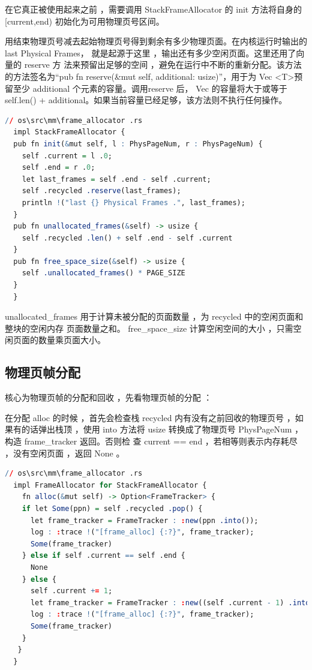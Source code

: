 \documentclass[12pt, a4paper]{ctexart}
\begin{document}
	在它真正被使用起来之前 ，需要调用 StackFrameAllocator 的  init 方法将自身的  [current,end) 初始化为可用物理页号区间。
	
	用结束物理页号减去起始物理页号得到剩余有多少物理页面。在内核运行时输出的 last {} Physical Frames， 就是起源于这里 ，输出还有多少空闲页面。这里还用了向量的 reserve 方 法来预留出足够的空间 ，避免在运行中不断的重新分配。该方法的方法签名为“pub fn reserve(\&mut self, additional: usize)”，用于为 Vec \textless T\textgreater 预留至少 additional 个元素的容量。调用reserve 后， Vec 的容量将大于或等于 self.len() + additional。如果当前容量已经足够，该方法则不执行任何操作。
	
\begin{lstlisting}[language=R]
  // os\src\mm\frame_allocator .rs
  impl StackFrameAllocator {
  pub fn init(&mut self, l : PhysPageNum, r : PhysPageNum) {
    self .current = l .0;
    self .end = r .0;
    let last_frames = self .end - self .current;
    self .recycled .reserve(last_frames);
    println !("last {} Physical Frames .", last_frames);
  }
  pub fn unallocated_frames(&self) -> usize {
    self .recycled .len() + self .end - self .current
  }
  pub fn free_space_size(&self) -> usize {
    self .unallocated_frames() * PAGE_SIZE
  }
  }
\end{lstlisting}
	
	unallocated\_frames 用于计算未被分配的页面数量 ，为 recycled 中的空闲页面和整块的空闲内存 页面数量之和。   free\_space\_size 计算空闲空间的大小 ，只需空闲页面的数量乘页面大小。
	\subsection{物理页帧分配}
	核心为物理页帧的分配和回收 ，先看物理页帧的分配 ：
	
	在分配  alloc 的时候 ，首先会检查栈  recycled 内有没有之前回收的物理页号 ，如果有的话弹出栈顶 ，使用  into 方法将  usize 转换成了物理页号  PhysPageNum ，构造 frame\_tracker 返回。否则检 查 current ==  end ，若相等则表示内存耗尽 ，没有空闲页面 ，返回 None 。
\begin{lstlisting}[language=R]
  // os\src\mm\frame_allocator .rs
  impl FrameAllocator for StackFrameAllocator {
    fn alloc(&mut self) -> Option<FrameTracker> {
	if let Some(ppn) = self .recycled .pop() {
	  let frame_tracker = FrameTracker : :new(ppn .into());
	  log : :trace !("[frame_alloc] {:?}", frame_tracker);
	  Some(frame_tracker)
	} else if self .current == self .end {
	  None
	} else {
	  self .current += 1;
	  let frame_tracker = FrameTracker : :new((self .current - 1) .into());
	  log : :trace !("[frame_alloc] {:?}", frame_tracker);
	  Some(frame_tracker)
	}
   }
  }
\end{lstlisting}
	
\end{document}
